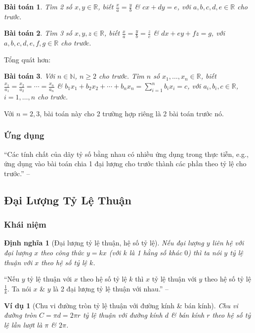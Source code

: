 \documentclass{article}
\numberwithin{equation}{section}
\newtheorem{dinhnghia}{Định nghĩa}[section]
\newtheorem{vidu}{Ví dụ}[section]
\newtheorem{baitoan}{Bài toán}[section]
\begin{document}
\begin{baitoan}
	Tìm 2 số $x,y\in\mathbb{R}$, biết $\frac{x}{a} = \frac{y}{b}$ \& $cx + dy = e$, với $a,b,c,d,e\in\mathbb{R}$ cho trước.
\end{baitoan}

\begin{baitoan}
	Tìm 3 số $x,y,z\in\mathbb{R}$, biết $\frac{x}{a} = \frac{y}{b} = \frac{z}{c}$ \& $dx + ey + fz = g$, với $a,b,c,d,e,f,g\in\mathbb{R}$ cho trước.
\end{baitoan}
Tổng quát hơn:
\begin{baitoan}
	Với $n\in\mathbb{N}$, $n\ge 2$ cho trước. Tìm $n$ số $x_1,\ldots,x_n\in\mathbb{R}$, biết $\frac{x_1}{a_1} = \frac{x_2}{a_2} = \cdots = \frac{x_n}{a_n}$ \& $b_1x_1 + b_2x_2 + \cdots + b_nx_n = \sum_{i=1}^n b_ix_i = c$, với $a_i,b_i,c\in\mathbb{R}$, $i = 1,\ldots,n$ cho trước.
\end{baitoan}
Với $n = 2,3$, bài toán này cho 2 trường hợp riêng là 2 bài toán trước nó.

\subsubsection{Ứng dụng}
``Các tính chất của dãy tỷ số bằng nhau có nhiều ứng dụng trong thực tiễn, e.g., ứng dụng vào bài toán chia 1 đại lượng cho trước thành các phần theo tỷ lệ cho trước.'' -- \cite[p. 57]{SGK_Toan_7_Canh_Dieu_tap_1}

\subsection{Đại Lượng Tỷ Lệ Thuận}

\subsubsection{Khái niệm}

\begin{dinhnghia}[Đại lượng tỷ lệ thuận, hệ số tỷ lệ]
	Nếu đại lượng $y$ liên hệ với đại lượng $x$ theo công thức $y = kx$ (với $k$ là 1 hằng số khác $0$) thì ta nói \emph{$y$ tỷ lệ thuận} với $x$ theo \emph{hệ số tỷ lệ $k$}.
\end{dinhnghia}
``Nếu $y$ tỷ lệ thuận với $x$ theo hệ số tỷ lệ $k$ thì $x$ tỷ lệ thuận với $y$ theo hệ số tỷ lệ $\frac{1}{k}$. Ta nói $x$ \& $y$ là 2 đại lượng tỷ lệ thuận với nhau.'' -- \cite[p. 59]{SGK_Toan_7_Canh_Dieu_tap_1}

\begin{vidu}[Chu vi đường tròn tỷ lệ thuận với đường kính \& bán kính]
	Chu vi đường tròn $C = \pi d = 2\pi r$ tỷ lệ thuận với đường kính $d$ \& bán kính $r$ theo hệ số tỷ lệ lần lượt là $\pi$ \& $2\pi$. 
\end{vidu}
\end{document}
